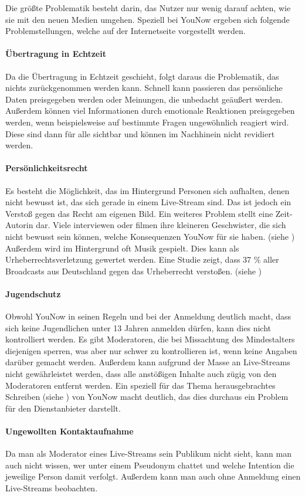 Die größte Problematik besteht darin, das Nutzer nur wenig darauf achten, wie sie mit den neuen Medien umgehen. Speziell bei YouNow ergeben sich folgende Problemstellungen, welche auf der Internetseite \cite{KS15} vorgestellt werden.

\paragraph{Übertragung in Echtzeit}
Da die Übertragung in Echtzeit geschieht, folgt daraus die Problematik, das nichts zurückgenommen werden kann. Schnell kann passieren das persönliche Daten preisgegeben werden oder Meinungen, die unbedacht geäußert werden. Außerdem können viel Informationen durch emotionale Reaktionen preisgegeben werden, wenn beispielsweise auf bestimmte Fragen ungewöhnlich reagiert wird. Diese sind dann für alle sichtbar und können im Nachhinein nicht revidiert werden.

\paragraph{Persönlichkeitsrecht}
Es besteht die Möglichkeit, das im Hintergrund Personen sich aufhalten, denen nicht bewusst ist, das sich gerade in einem Live-Stream sind. Das ist jedoch ein Verstoß gegen das Recht am eigenen Bild. Ein weiteres Problem stellt eine Zeit-Autorin dar. Viele interviewen oder filmen ihre kleineren Geschwister, die sich nicht bewusst sein können, welche Konsequenzen YouNow für sie haben. (siehe \cite{ZEIT15})
Außerdem wird im Hintergrund oft Musik gespielt. Dies kann als Urheberrechtsverletzung gewertet werden. Eine Studie zeigt, dass 37 \% aller Broadcasts aus Deutschland gegen das Urheberrecht verstoßen. (siehe \cite{HFMNF15})

\paragraph{Jugendschutz}
Obwohl YouNow in seinen Regeln und bei der Anmeldung deutlich macht, dass sich keine Jugendlichen unter 13 Jahren anmelden dürfen, kann dies nicht kontrolliert werden. Es gibt Moderatoren, die bei Missachtung des Mindestalters diejenigen sperren, was aber nur schwer zu kontrollieren ist, wenn keine Angaben darüber gemacht werden. Außerdem kann aufgrund der Masse an Live-Streams nicht gewährleistet werden, dass alle anstößigen Inhalte auch zügig von den Moderatoren entfernt werden. Ein speziell für das Thema herausgebrachtes Schreiben (siehe \cite{YTD15}) von YouNow macht deutlich, das dies durchaus ein Problem für den Dienstanbieter darstellt. 

\paragraph{Ungewollten Kontaktaufnahme}
Da man als Moderator eines Live-Streams sein Publikum nicht sieht, kann man auch nicht wissen, wer unter einem Pseudonym chattet und welche Intention die jeweilige Person damit verfolgt. Außerdem kann man auch ohne Anmeldung einen Live-Streams beobachten.


